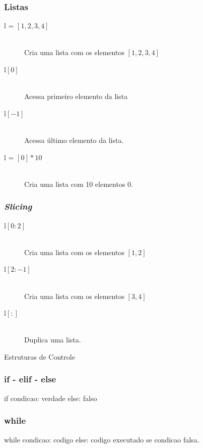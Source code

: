 \begin{frame}
    \frametitle{Listas}
    \begin{description}
        \item[l = {$[1,2,3,4]$}] \hfill \\ Cria uma lista com os elementos $[1,2,3,4]$
        \item[l{$[0]$}] \hfill \\ Acessa primeiro elemento da lista
        \item[l{$[-1]$}] \hfill \\ Acessa último elemento da lista.
        \item[l = {$[0]*10$}] \hfill \\ Cria uma lista com 10 elementos $0$.
    \end{description}
\end{frame}

\begin{frame}
    \frametitle{\textit{Slicing}}
    \begin{description}
        \item[l{$[0:2]$}] \hfill \\ Cria uma lista com os elementos $[1,2]$
        \item[l{$[2:-1]$}] \hfill \\ Cria uma lista com os elementos $[3,4]$
        \item[l{$[:]$}] \hfill \\ Duplica uma lista.
    \end{description}
\end{frame}

\begin{frame}
    \begin{center}
        \Huge Estruturas de Controle
    \end{center}
\end{frame}

\begin{frame}[fragile]
    \frametitle{if - elif - else}
    \begin{python}
        if condicao:
            verdade
        else:
            falso
    \end{python}
\end{frame}

\begin{frame}[fragile]
    \frametitle{while}
    \begin{python}
        while condicao:
            codigo
        else:
            codigo executado se condicao falsa.
    \end{python}
\end{frame}

